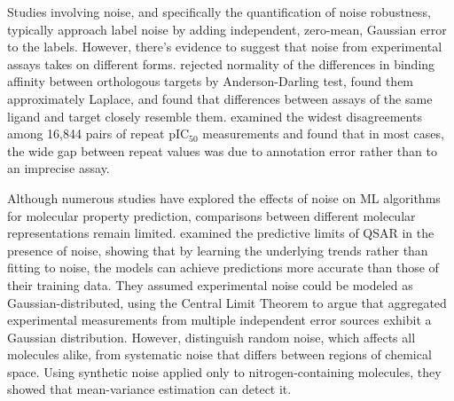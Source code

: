 Studies involving noise, and specifically the quantification of noise robustness, typically approach label noise by adding independent, zero-mean, Gaussian error to the labels. However, there's evidence to suggest that noise from experimental assays takes on different forms. \citet{Kruger2012} rejected normality of the differences in binding affinity between orthologous targets by Anderson-Darling test, found them approximately Laplace, and found that differences between assays of the same ligand and target closely resemble them. \citet{Kalliokoski2013} examined the widest disagreements among 16,844 pairs of repeat pIC$_{50}$ measurements and found that in most cases, the wide gap between repeat values was due to annotation error rather than to an imprecise assay. 

Although numerous studies have explored the effects of noise on ML algorithms for molecular property prediction, comparisons between different molecular representations remain limited. \citet{Kolmar2021} examined the predictive limits of QSAR in the presence of noise, showing that by learning the underlying trends rather than fitting to noise, the models can achieve predictions more accurate than those of their training data. They assumed experimental noise could be modeled as Gaussian-distributed, using the Central Limit Theorem to argue that aggregated experimental measurements from multiple independent error sources exhibit a Gaussian distribution. However, \citet{Heid2023} distinguish random noise, which affects all molecules alike, from systematic noise that differs between regions of chemical space. Using synthetic noise applied only to nitrogen-containing molecules, they showed that mean-variance estimation can detect it.

